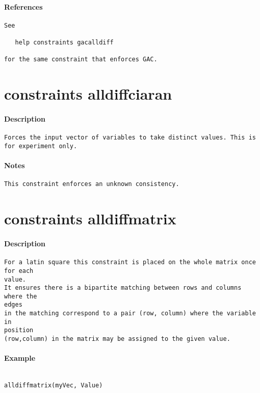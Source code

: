 \paragraph{References}
{\footnotesize
\begin{verbatim}
See

   help constraints gacalldiff

for the same constraint that enforces GAC.
\end{verbatim}
}
\section{constraints alldiffciaran}
\paragraph{Description}
{\footnotesize
\begin{verbatim}
Forces the input vector of variables to take distinct values. This is for experiment only.
\end{verbatim}
}
\paragraph{Notes}
{\footnotesize
\begin{verbatim}
This constraint enforces an unknown consistency.
\end{verbatim}
}
\section{constraints alldiffmatrix}
\paragraph{Description}
{\footnotesize
\begin{verbatim}
For a latin square this constraint is placed on the whole matrix once for each
value.
It ensures there is a bipartite matching between rows and columns where the
edges
in the matching correspond to a pair (row, column) where the variable in
position
(row,column) in the matrix may be assigned to the given value.
\end{verbatim}
}
\paragraph{Example}
{\footnotesize
\begin{verbatim}

alldiffmatrix(myVec, Value)
\end{verbatim}
}
